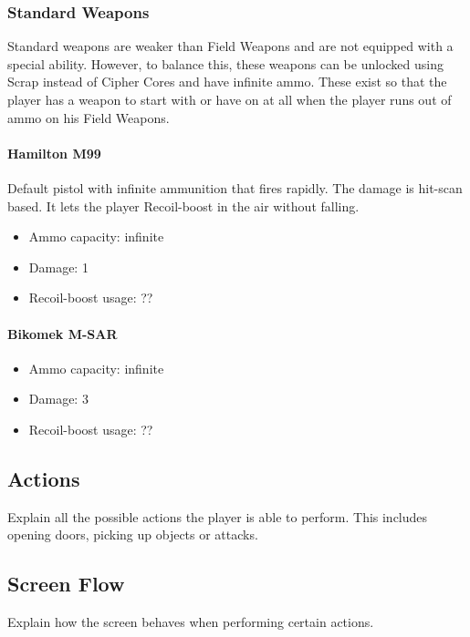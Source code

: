 \documentclass[12pt]{article}
\begin{document}
\subsubsection{Standard Weapons}

Standard weapons are weaker than Field Weapons and are not equipped with a special ability. However, to balance this, these weapons can be unlocked using Scrap instead of Cipher Cores and have infinite ammo.  These exist so that the player has a weapon to start with or have on at all when the player runs out of ammo on his Field Weapons.

\paragraph{Hamilton M99} 

Default pistol with infinite ammunition that fires rapidly. The damage is hit-scan based. It lets the player Recoil-boost in the air without falling.

\begin{itemize}
	\item Ammo capacity: infinite
	\item Damage: 1
	\item Recoil-boost usage: ??
\end{itemize}

\paragraph{Bikomek M-SAR} 

\begin{itemize}
	\item Ammo capacity: infinite
	\item Damage: 3
	\item Recoil-boost usage: ??
\end{itemize}

\subsection{Actions}

Explain all the possible actions the player is able to perform. This includes opening doors, picking up objects or attacks.

\subsection{Screen Flow}

Explain how the screen behaves when performing certain actions.
\end{document}
